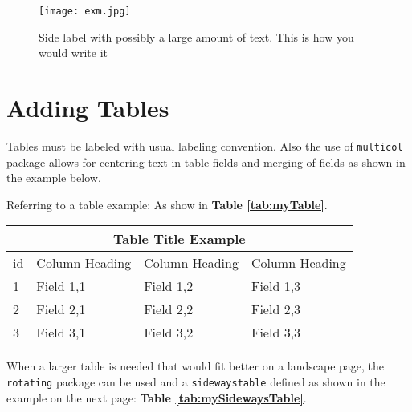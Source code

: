 \begin{SCfigure}
  \centering
  \caption{Side label with possibly a large amount of text. This is how you would write it}
  \texttt{[image: exm.jpg]}%
  \label{fig:sidecaption-fig}
\end{SCfigure}

\section{Adding Tables}
\label{sec:adding-tables}

Tables must be labeled with usual labeling convention. Also the use of \texttt{multicol} package allows for centering text in table fields and merging of fields as shown in the example below.

Referring to a table example: As show in \textbf{Table \ref{tab:myTable}}. \\

\begin{tabular}{ |p{0.5cm}|p{4cm}|p{4cm}|p{4cm}|  }

 \hline
 	\multicolumn{4}{|c|}{Table Title Example} \\
 \hline
 	\multicolumn{1}{|c|}{id} &
 	\multicolumn{1}{|c|}{Column Heading} &
 	\multicolumn{1}{|c|}{Column Heading} &
 	\multicolumn{1}{|c|}{Column Heading}  \\
 \hline
 	1 & Field 1,1 & Field 1,2 & Field 1,3 \\
 \hline
 	2 & Field 2,1 & Field 2,2 & Field 2,3 \\
 \hline
 	3 & Field 3,1 & Field 3,2 & Field 3,3 \\
 \hline

\end{tabular}
\label{tab:myTable}
\vspace{0.4cm}

When a larger table is needed that would fit better on a landscape page, the \texttt{rotating} package can be used and a \texttt{sidewaystable} defined as shown in the example on the next page: \textbf{Table \ref{tab:mySidewaysTable}}.


